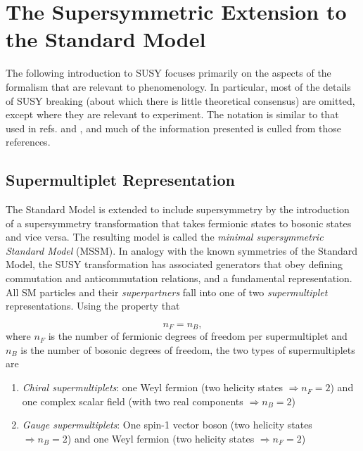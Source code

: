 \documentclass[dissertation.tex]{subfiles}
\begin{document}
\chapter{The Supersymmetric Extension to the Standard Model}
\label{chap:The Supersymmetric Extension to the Standard Model}

The following introduction to SUSY focuses primarily on the aspects of the formalism that are relevant to phenomenology.  In particular, most of the details of SUSY breaking (about which there is little theoretical consensus) are omitted, except where they are relevant to experiment.  The notation is similar to that used in refs. \cite{Aitchison} and \cite{SUSY_primer}, and much of the information presented is culled from those references.

\section{Supermultiplet Representation}
\label{sec:Supermultiplet Representation}

The Standard Model is extended to include supersymmetry by the introduction of a supersymmetry transformation that takes fermionic states to bosonic states and vice versa.  The resulting model is called the \textit{minimal supersymmetric Standard Model} (MSSM).  In analogy with the known symmetries of the Standard Model, the SUSY transformation has associated generators that obey defining commutation and anticommutation relations, and a fundamental representation.  All SM particles and their \textit{superpartners} fall into one of two \textit{supermultiplet} representations.  Using the property that

\begin{equation}
n_{F} = n_{B},
\end{equation}
%
where $n_{F}$ is the number of fermionic degrees of freedom per supermultiplet and $n_{B}$ is the number of bosonic degrees of freedom, the two types of supermultiplets are

\begin{enumerate}
  \item \textit{Chiral supermultiplets}: one Weyl fermion (two helicity states $\Rightarrow n_{F} = 2$) and one complex scalar field (with two real components $\Rightarrow n_{B} = 2$)
  \item \textit{Gauge supermultiplets}: One spin-1 vector boson (two helicity states $\Rightarrow n_{B} = 2$) and one Weyl fermion (two helicity states $\Rightarrow n_{F} = 2$)
\end{enumerate}
\end{document}
